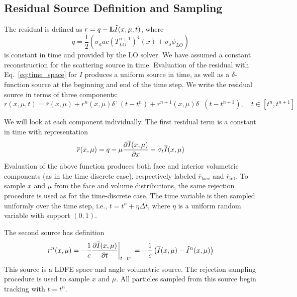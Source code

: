 \subsection{Residual Source Definition and Sampling}
\label{sec:time_sampling}

The residual is defined as $r = q - \mathbf{L} \tilde I(x,\mu,t)$, where
\begin{equation}
    q=\frac{1}{2}\left(\sigma_a a c (T_{LO}^{n+1})^4(x) + \sigma_s\overline\phi_{LO}\right)
\end{equation}
is constant in time and provided by the LO solver. We have assumed a constant reconstruction for the scattering source
in time.
Evaluation of the residual with Eq.~\eqref{eq:time_space} for $I$ produces a uniform source in time, as well as a $\delta$-function source at the
beginning and end of the time step.  We write the residual source in terms of three components:
\begin{equation}
    r(x,\mu,t) = \overline r(x,\mu)  + r^{n}(x,\mu)\delta^+(t-t^{n}) +
    r^{n+1}(x,\mu)\delta^-(t - t^{n+1}),
    \quad t\in[t^{n},t^{n+1}]
\end{equation}

We will look at each component individually.  
The first residual term is a constant in time with representation
\begin{equation}
    \overline r(x,\mu) = q  - \mu \frac{\partial \overline I(x,\mu)}{\partial x} - \sigma_t \overline
    I(x,\mu)
\end{equation}
Evaluation of the above function produces both face and interior volumetric components (as
in the time discrete case), respectively labeled $\overline r_{\text{face}}$ and
$\overline{r}_{\text{int}}$.  To sample $x$ and $\mu$ from the face and volume distributions, the
same rejection procedure is used as for the time-discrete case.    The time variable is then sampled uniformly over the time step,
i.e., $t=t^n + \eta \Delta t$, where $\eta$ is a uniform random variable with support
$(0,1)$.

The second source has definition
\begin{equation}
    r^{n}(x,\mu) = -\frac{1}{c}\frac{\partial \overline{I}(x,\mu)}{\partial t}\bigg|_{t=t^{n}}
    =-\frac{1}{c}\left(\overline I(x,\mu) - \tilde I^{n}(x,\mu)\right)
\end{equation}
This source is a LDFE space and angle volumetric source.
The rejection sampling procedure is used to sample $x$ and $\mu$.
All particles sampled from this source begin tracking with $t=t^{n}$.

